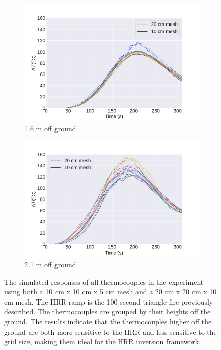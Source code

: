 \documentclass{article}
\begin{document}
\begin{figure}[htbp]
\begin{subfigure}[t]{.45\textwidth}
      \includegraphics[width=\textwidth ,keepaspectratio]{figures/16mesh_sensitivity.pdf}
      \caption{1.6 m off ground}
      \label{fig:1.6mesh_sensitivity}
  \end{subfigure}
    \begin{subfigure}[t]{.45\textwidth}
      \centering
      \includegraphics[width=\textwidth ,keepaspectratio]{figures/211mesh_sensitivity.pdf}
      \caption{2.1 m off ground}
      \label{fig:2.11mesh_sensitivity}
  \end{subfigure}
  \caption{The simulated responses of all thermocouples in the experiment using both a 10 cm x 10 cm x 5 cm mesh and a 20 cm x 20 cm x 10 cm mesh. The HRR ramp is the 100 second triangle fire previously described. The thermocouples are grouped by their heights off the ground. The results indicate that the thermocouples higher off the ground are both more sensitive to the HRR and less sensitive to the grid size, making them ideal for the HRR inversion framework.}
  \label{fig:grid_sensitivity}
\end{figure}
\end{document}
